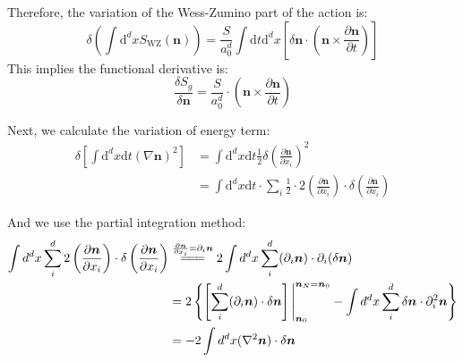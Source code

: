 Therefore, the variation of the Wess-Zumino part of the action is:
\begin{equation}
\delta (\int \mathrm{d}^d x S_{\mathrm{WZ}}(\bm{n})) 
= \frac{S}{a_0^d} \int \mathrm{d}t \mathrm{d}^d x [\delta \bm{n} \cdot (\bm{n} \times \frac{\partial \bm{n}}{\partial t})]
\end{equation}
This implies the functional derivative is:
\begin{equation}
\frac{\delta S_g}{\delta \bm{n}} = \frac{S}{a_0^d} \cdot (\bm{n} \times \frac{\partial \bm{n}}{\partial t})
\end{equation}

Next, we calculate the variation of energy term:
\begin{equation}
\begin{aligned}
\delta [\int \mathrm{d}^d x \mathrm{d}t (\nabla \bm{n})^2] &= \int \mathrm{d}^d x \mathrm{d}t \frac{1}{2} \delta (\frac{\partial \bm{n}}{\partial x_i})^2 \\
&= \int \mathrm{d}^d x \mathrm{d}t \cdot \sum_i \frac{1}{2} \cdot 2 (\frac{\partial \bm{n}}{\partial x_i}) \cdot \delta (\frac{\partial \bm{n}}{\partial x_i})
\end{aligned}
\end{equation}

And we use the partial integration method:
\begin{equation}
\begin{aligned}
    \int d^d x \sum_i^d 2 \left( \frac{\partial \bm{n}}{\partial x_i} \right) \cdot \delta \left( \frac{\partial \bm{n}}{\partial x_i} \right) 
    &\overset{\frac{\partial \bm{n}}{\partial x_i} = \partial_i \bm{n}}{=\joinrel=\joinrel=} 
    2 \int d^d x \sum_i^d (\partial_i \bm{n}) \cdot \partial_i (\delta \bm{n}) \\
    &= 2 \left\{ \left[ \sum_i^d (\partial_i \bm{n}) \cdot \delta \bm{n} \right] \Bigg|_{\bm{n}_0}^{\bm{n}_N = \bm{n}_0}
    - \int d^d x \sum_i^d \delta \bm{n} \cdot \partial_i^2 \bm{n} \right\} \\
    &= -2 \int d^d x (\nabla^2 \bm{n}) \cdot \delta \bm{n}
\end{aligned}
\end{equation}

